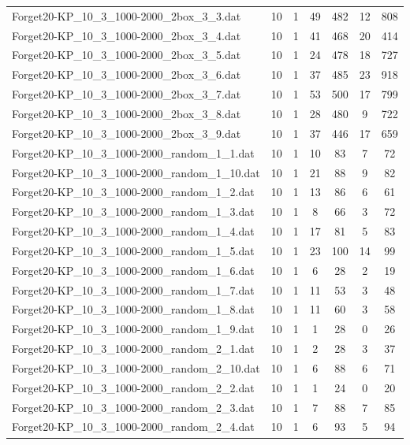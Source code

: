 \begin{table}[!ht]
\begin{tabular}{lcccccc}
Forget20-KP\_10\_3\_1000-2000\_2box\_3\_3.dat & 10 & 1 & 49 & 482 & 12 & 808 \\
Forget20-KP\_10\_3\_1000-2000\_2box\_3\_4.dat & 10 & 1 & 41 & 468 & 20 & 414 \\
Forget20-KP\_10\_3\_1000-2000\_2box\_3\_5.dat & 10 & 1 & 24 & 478 & 18 & 727 \\
Forget20-KP\_10\_3\_1000-2000\_2box\_3\_6.dat & 10 & 1 & 37 & 485 & 23 & 918 \\
Forget20-KP\_10\_3\_1000-2000\_2box\_3\_7.dat & 10 & 1 & 53 & 500 & 17 & 799 \\
Forget20-KP\_10\_3\_1000-2000\_2box\_3\_8.dat & 10 & 1 & 28 & 480 & 9 & 722 \\
Forget20-KP\_10\_3\_1000-2000\_2box\_3\_9.dat & 10 & 1 & 37 & 446 & 17 & 659 \\
Forget20-KP\_10\_3\_1000-2000\_random\_1\_1.dat & 10 & 1 & 10 & 83 & 7 & 72 \\
Forget20-KP\_10\_3\_1000-2000\_random\_1\_10.dat & 10 & 1 & 21 & 88 & 9 & 82 \\
Forget20-KP\_10\_3\_1000-2000\_random\_1\_2.dat & 10 & 1 & 13 & 86 & 6 & 61 \\
Forget20-KP\_10\_3\_1000-2000\_random\_1\_3.dat & 10 & 1 & 8 & 66 & 3 & 72 \\
Forget20-KP\_10\_3\_1000-2000\_random\_1\_4.dat & 10 & 1 & 17 & 81 & 5 & 83 \\
Forget20-KP\_10\_3\_1000-2000\_random\_1\_5.dat & 10 & 1 & 23 & 100 & 14 & 99 \\
Forget20-KP\_10\_3\_1000-2000\_random\_1\_6.dat & 10 & 1 & 6 & 28 & 2 & 19 \\
Forget20-KP\_10\_3\_1000-2000\_random\_1\_7.dat & 10 & 1 & 11 & 53 & 3 & 48 \\
Forget20-KP\_10\_3\_1000-2000\_random\_1\_8.dat & 10 & 1 & 11 & 60 & 3 & 58 \\
Forget20-KP\_10\_3\_1000-2000\_random\_1\_9.dat & 10 & 1 & 1 & 28 & 0 & 26 \\
Forget20-KP\_10\_3\_1000-2000\_random\_2\_1.dat & 10 & 1 & 2 & 28 & 3 & 37 \\
Forget20-KP\_10\_3\_1000-2000\_random\_2\_10.dat & 10 & 1 & 6 & 88 & 6 & 71 \\
Forget20-KP\_10\_3\_1000-2000\_random\_2\_2.dat & 10 & 1 & 1 & 24 & 0 & 20 \\
Forget20-KP\_10\_3\_1000-2000\_random\_2\_3.dat & 10 & 1 & 7 & 88 & 7 & 85 \\
Forget20-KP\_10\_3\_1000-2000\_random\_2\_4.dat & 10 & 1 & 6 & 93 & 5 & 94 \\

\end{tabular}
\end{table}
